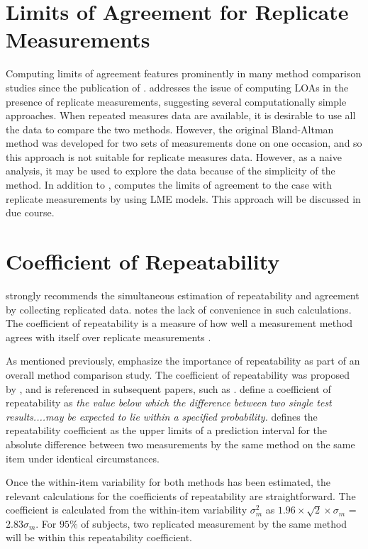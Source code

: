 \documentclass[12pt, a4paper]{report}
\theoremstyle{plain}
\theoremstyle{definition}
\theoremstyle{remark}
\begin{document}
	
\section{Limits of Agreement for Replicate Measurements}

Computing limits of agreement features prominently in many method comparison studies since the publication of \citet{BA86}.
\citet{BA99} addresses the issue of computing LOAs in the presence of replicate measurements, suggesting several computationally simple approaches. When repeated measures data are available, it is desirable to use
all the data to compare the two methods. However, the original Bland-Altman method was developed for two sets of measurements done on one occasion, and so this approach is not suitable for replicate measures data. However, as a naive analysis, it may be used to explore the data because of the simplicity of the method.
In addition to \citet{BA99}, \citet{BXC2008} computes the limits of agreement to the case with replicate measurements by using LME models. This approach will be discussed in due course.


\section{Coefficient of Repeatability}


\citet{BA99} strongly recommends the simultaneous estimation of repeatability and agreement by  collecting replicated data. \citet{ARoy2009} notes the lack of convenience in such calculations. The coefficient of repeatability is a measure of how well a measurement method agrees with itself over replicate measurements \citep{BA99}. 
	
As mentioned previously, \citet{Barnhart} emphasize the importance of repeatability as part of an overall method comparison study. The coefficient of repeatability was proposed by \citet{BA99}, and is referenced in subsequent papers, such as \citet{BXC2008}. \citet{BSIrepeat} define a coefficient of
repeatability as \emph{the value below which the difference between two single test results....may be expected to lie within a specified probability.} \citet{BA99} defines the repeatability coefficient as the upper limits of a prediction interval for the absolute difference between two measurements by the same method on the same item under identical circumstances. %

 Once the within-item variability for both methods has been estimated, the relevant calculations for the coefficients of repeatability are straightforward.
The coefficient is calculated from the within-item variability $\sigma^2_{m}$ as  $1.96 \times \sqrt{2} \times \sigma_m$ = $2.83 \sigma_m$. For $95\%$ of subjects, two replicated measurement by the same method will be within this repeatability coefficient.
	
\end{document}
